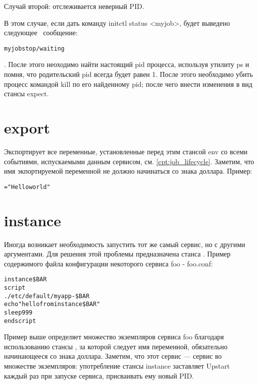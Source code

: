 Случай второй: отслеживается неверный PID.

В этом случае, если дать команду initctl status <myjob>, будет выведено следующее ~сообщение: \begin{alltt}
myjob stop/waiting
\end{alltt}. После этого неоходимо найти настоящий pid процесса, используя утилиту ps и помня, что родительский pid всегда будет равен 1. После этого необходимо убить процесс командой kill по его найденному pid; после чего внести изменения в вид стансы expect.
\section{export}
Экспортирует все переменные, установленные перед этим стансой env со всеми событиями, испускаемыми данным сервисом, см. \autoref{cpt:job_lifecycle}. Заметим, что имя экпортируемой переменной не должно начинаться со знака доллара.
Пример: \begin{alltt}
="Hello world"
\end{alltt} 
\section{instance}
Иногда возникает необходимость запустить тот же самый сервис, но с другими аргументами. Для решения этой проблемы предназначена станса . Пример содержимого файла конфигурации некоторого сервиса foo - foo.conf: \begin{alltt}
instance \$BAR
script
. /etc/default/myapp-\${BAR}
echo "hello from instance \$BAR"
sleep 999
end script
\end{alltt} Пример выше определяет множество экземпляров сервиса foo благодаря использованию стансы , за которой следует имя переменной, обязательно начинающееся со знака доллара. 
Заметим, что этот сервис --- сервис во множестве экземпляров: употребление стансы instance заставляет Upstart каждый раз при запуске сервиса, присваивать ему новый PID. 

